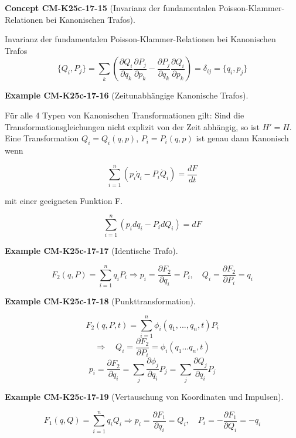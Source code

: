 \documentclass[10pt, letterpaper]{article}
\newcommand{\CustomHeading}[3]{%
  \par\medskip\noindent%
  \textbf{#1 #2} \textnormal{(#3)}.\enskip%
}
\newenvironment{EXA}[2]{\CustomHeading{Example}{#1}{#2}}{}
\newenvironment{CONC}[2]{\CustomHeading{Concept}{#1}{#2}}{}
\begin{document}
\begin{CONC}{CM-K25c-17-15}{Invarianz der fundamentalen Poisson-Klammer-Relationen bei Kanonischen Trafos}
Invarianz der fundamentalen Poisson-Klammer-Relationen bei Kanonischen Trafos
\[
\{Q_i, P_j\} = \sum_k \left(\frac{\partial Q_i}{\partial q_k}\frac{\partial P_j}{\partial p_k} - \frac{\partial P_j}{\partial q_k}\frac{\partial Q_i}{\partial p_k}\right) = \delta_{ij} = \{q_i, p_j\}
\]
\end{CONC}

\begin{EXA}{CM-K25c-17-16}{Zeitunabhängige Kanonische Trafos}
Für alle 4 Typen von Kanonischen Transformationen gilt:
Sind die Transformationsgleichungen nicht explizit von der Zeit abhängig, so ist $H' = H$. Eine Transformation $Q_i = Q_i(q,p)$, $P_i = P_i(q,p)$ ist genau dann Kanonisch wenn

\[\sum_{i=1}^n (p_i\dot{q}_i - P_i\dot{Q}_i) = \frac{dF}{dt}\]

mit einer geeigneten Funktion F.

\[\sum_{i=1}^n (p_idq_i - P_idQ_i) = dF\]
\end{EXA}

\begin{EXA}{CM-K25c-17-17}{Identische Trafo}
\[F_2(q,P) = \sum_{i=1}^n q_iP_i \Rightarrow p_i = \frac{\partial F_2}{\partial q_i} = P_i, \quad Q_i = \frac{\partial F_2}{\partial P_i} = q_i\]
\end{EXA}

\begin{EXA}{CM-K25c-17-18}{Punkttransformation}
\[F_2(q,P,t) = \sum_{i=1}^n \phi_i(q_1,...,q_n,t)P_i\]
\[\Rightarrow \quad Q_i = \frac{\partial F_2}{\partial P_i} = \phi_i(q_1...q_n,t)\]
\[p_i = \frac{\partial F_2}{\partial q_i} = \sum_j \frac{\partial \phi_j}{\partial q_i}P_j = \sum_j \frac{\partial Q_j}{\partial q_i}P_j\]
\end{EXA}

\begin{EXA}{CM-K25c-17-19}{Vertauschung von Koordinaten und Impulsen}
\[F_1(q,Q) = \sum_{i=1}^n q_iQ_i \Rightarrow p_i = \frac{\partial F_1}{\partial q_i} = Q_i, \quad P_i = -\frac{\partial F_1}{\partial Q_i} = -q_i\]
\end{EXA}
\end{document}
